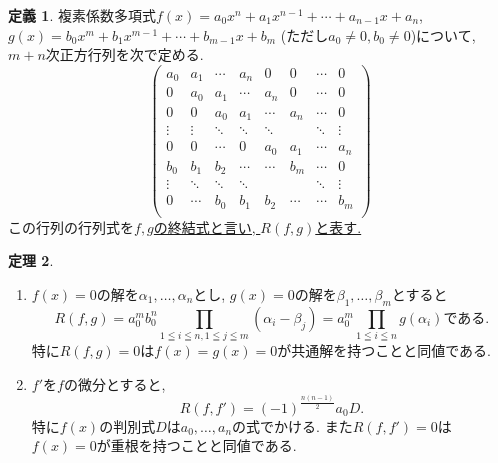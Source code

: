\documentclass[dvipdfmx,a4paper,11pt]{article}
\theoremstyle{definition}
\newtheorem{thm}{定理}
\newtheorem{dfn}[thm]{定義}
\begin{document}
\begin{tcolorbox}[
    colback = white,
    colframe = green!35!black,
    fonttitle = \bfseries,
    breakable = true]
    \begin{dfn}
複素係数多項式$f(x) = a_0 x^{n} +  a_1 x^{n-1} +  \cdots +  a_{n-1} x + a_{n}$, 
$g(x) = b_0 x^{m} +  b_1 x^{m-1} +  \cdots +  b_{m-1} x + b_{m}$
(ただし$a_0 \neq 0, b_0 \neq 0$)について, $m+n$次正方行列を次で定める.
$$
 \begin{pmatrix}
 a_0 	& a_1& \cdots &a_n 	&0		&0 	     & \cdots&0 \\
0   		& a_0 & a_1		& \cdots &a_n 	&0 	      & \cdots&0 \\
 0 		& 0      & a_0 		&    a_1	& \cdots &a_n  & \cdots&0 \\
\vdots  & \vdots  &      \ddots 	&     \ddots &  \ddots     &   & \ddots&\vdots \\
   0		 & 0         &	 \cdots	&    0	& a_0 &a_1 & \cdots &a_n \\
 b_0 	& b_1& b_2 &  \cdots  	& \cdots		&b_m	     & \cdots&0 \\
\vdots 	&    \ddots 	&   \ddots    &   \ddots     & 		&   	    & \ddots&\vdots \\
0		&     \cdots 	&      b_0 & b_1 &  b_2  	&  \cdots& \cdots&b_m \\
 \end{pmatrix}
$$
この行列の行列式を\underline{$f,g$の終結式と言い, $R(f,g)$と表す.}
    \end{dfn}
 \end{tcolorbox}


\begin{tcolorbox}[
    colback = white,
    colframe = green!35!black,
    fonttitle = \bfseries,
    breakable = true]
    \begin{thm}
    \begin{enumerate}
\item $f(x) =0$の解を$\alpha_1, \ldots, \alpha_n$とし, $g(x) =0$の解を$\beta_1, \ldots, \beta_m$とすると
$$
R(f,g) = a_{0}^{m}b_{0}^{n} \prod_{1 \leqq i \leqq n, 1\leqq j \leqq m} (\alpha_i - \beta_j)
=a_{0}^{m} \prod_{1 \leqq i \leqq n} g(\alpha_{i})\text{である.}
$$
特に$R(f,g)=0$は$f(x)=g(x)=0$が共通解を持つことと同値である.
\item $f'$を$f$の微分とすると, 
$$
R(f, f') = (-1)^{\frac{n(n-1)}{2}} a_0 D.
$$
特に$f(x)$の判別式$D$は$a_0, \ldots, a_n$の式でかける. また$R(f,f')=0$は$f(x)=0$が重根を持つことと同値である.
    \end{enumerate}

    \end{thm}
 \end{tcolorbox}
 
 
 
\end{document}
